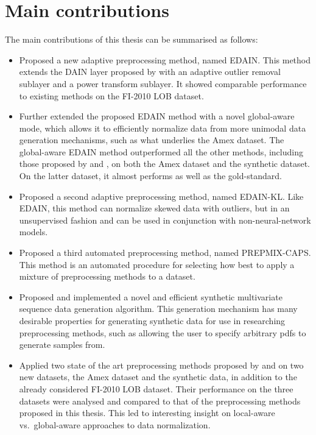 \documentclass{statsmsc}
\begin{document}
{%


\section{Main contributions}%
\label{sec:Main contributions}

The main contributions of this thesis can be summarised as follows:
\begin{itemize}
    \item Proposed a new adaptive preprocessing method, named \ac{EDAIN}.
        This method extends the \ac{DAIN} layer proposed by \cite{dain} with an
        adaptive outlier removal sublayer and a power transform sublayer. It showed comparable
        performance to existing methods on the FI-2010 \ac{LOB} dataset.
    \item Further extended the proposed \ac{EDAIN} method with a novel global-aware
        mode, which allows it to efficiently normalize data from more unimodal data generation
        mechanisms, such as what underlies the Amex dataset. The global-aware \ac{EDAIN} method
        outperformed all the other methods, including those proposed by \cite{dain} and
        \cite{bin}, on both the Amex dataset and the synthetic dataset. On the latter dataset,
        it almost performs as well as the gold-standard.
    \item Proposed a second adaptive preprocessing method, named \ac{EDAIN-KL}.
        Like \ac{EDAIN}, this method can normalize skewed data with outliers, but
        in an unsupervised fashion and can be used in conjunction with non-neural-network models.
    \item Proposed a third automated preprocessing method, named \ac{PREPMIX-CAPS}.
        This method is an automated procedure for selecting how best to apply a
        mixture of preprocessing methods to a dataset.
    \item Proposed and implemented a novel and efficient synthetic multivariate
        sequence data generation algorithm. This generation mechanism has many
        desirable properties for generating synthetic data for use in researching
        preprocessing methods, such as allowing the user to specify arbitrary
        \acp{pdf} to generate samples from.
    \item Applied two state of the art preprocessing methods proposed by \cite{dain} and \cite{bin}
        on two new datasets, the Amex dataset and the synthetic data, in
        addition to the already considered FI-2010 \ac{LOB} dataset. Their performance
        on the three datasets were analysed and compared to that of the
        preprocessing methods proposed in this thesis. This led to interesting insight on
        local-aware vs.\ global-aware approaches to data normalization.
\end{itemize}

}
\end{document}
